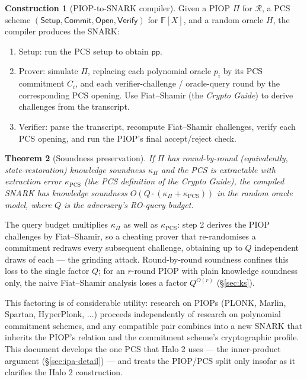 \documentclass[11pt,a4paper]{article}
\newtheorem{theorem}{Theorem}[section]
\theoremstyle{definition}
\newtheorem{construction}[theorem]{Construction}
\newcommand{\F}{\mathbb{F}}
\newcommand{\Comm}{\mathsf{Commit}}
\newcommand{\Open}{\mathsf{Open}}
\newcommand{\Setup}{\mathsf{Setup}}
\newcommand{\Verify}{\mathsf{Verify}}
\newcommand{\Rel}{\mathcal{R}}
\begin{document}
\begin{construction}[PIOP-to-SNARK compiler]\label{const:piop-snark}
Given a PIOP $\Pi$ for $\Rel$, a PCS scheme $(\Setup, \Comm, \Open, \Verify)$
for $\F[X]$, and a random oracle $H$, the compiler produces the SNARK:
\begin{enumerate}[leftmargin=*]
\item Setup: run the PCS setup to obtain $\mathsf{pp}$.
\item Prover: simulate $\Pi$, replacing each polynomial oracle $p_i$ by its
PCS commitment $C_i$, and each verifier-challenge / oracle-query round by
the corresponding PCS opening. Use Fiat--Shamir (the \emph{Crypto Guide}) to derive
challenges from the transcript.
\item Verifier: parse the transcript, recompute Fiat--Shamir challenges,
verify each PCS opening, and run the PIOP's final accept/reject check.
\end{enumerate}
\end{construction}

\begin{theorem}[Soundness preservation]\label{thm:piop-snark}
If $\Pi$ has round-by-round (equivalently, state-restoration) knowledge
soundness $\kappa_{\Pi}$ and the PCS is extractable
with extraction error $\kappa_{\mathrm{PCS}}$ (the PCS definition of the
\emph{Crypto Guide}), the compiled SNARK has knowledge soundness
$O(Q \cdot (\kappa_\Pi + \kappa_{\mathrm{PCS}}))$ in the random oracle model,
where $Q$ is the adversary's RO-query budget.
\end{theorem}

The query budget multiplies $\kappa_\Pi$ as well as
$\kappa_{\mathrm{PCS}}$: step 2 derives the PIOP challenges by
Fiat--Shamir, so a cheating prover that re-randomises a commitment
redraws every subsequent challenge, obtaining up to $Q$ independent
draws of each --- the grinding attack. Round-by-round soundness confines
this loss to the single factor $Q$; for an $r$-round PIOP with plain
knowledge soundness only, the naive Fiat--Shamir analysis loses a factor
$Q^{O(r)}$ (\S\ref{sec:ks}).

This factoring is of considerable utility: research on PIOPs (PLONK, Marlin,
Spartan, HyperPlonk, $\dots$) proceeds independently of research on
polynomial commitment schemes, and any compatible pair combines into a new
SNARK that inherits the PIOP's relation and the commitment scheme's
cryptographic profile. This document
develops the one PCS that Halo 2 uses --- the inner-product argument
(\S\ref{sec:ipa-detail}) --- and treats the PIOP/PCS split only insofar as
it clarifies the Halo 2 construction.
\end{document}
